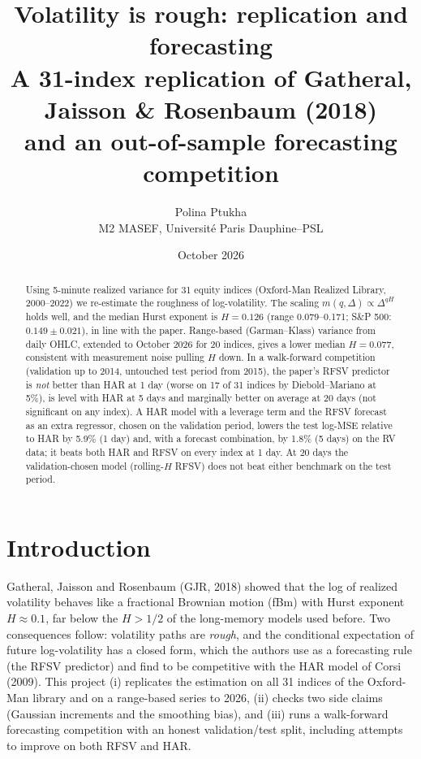 \documentclass[11pt,a4paper]{article}
\title{Volatility is rough: replication and forecasting\\[2pt]
\large A 31-index replication of Gatheral, Jaisson \& Rosenbaum (2018)\\ and an out-of-sample forecasting competition}
\author{Polina Ptukha\\ M2 MASEF, Universit\'e Paris Dauphine--PSL}
\date{October 2026}
\begin{document}
\maketitle

\begin{abstract}
\noindent
Using 5-minute realized variance for 31 equity indices (Oxford-Man Realized Library, 2000--2022) we
re-estimate the roughness of log-volatility. The scaling $m(q,\Delta)\propto\Delta^{qH}$ holds well,
and the median Hurst exponent is $H=0.126$ (range 0.079--0.171; S\&P 500: $0.149\pm0.021$), in line with the
paper. Range-based (Garman--Klass) variance from daily OHLC, extended to October 2026 for 20 indices,
gives a lower median $H=0.077$, consistent with measurement noise pulling $H$ down. In a walk-forward
competition (validation up to 2014, untouched test period from 2015), the paper's RFSV predictor is
\emph{not} better than HAR at 1 day (worse on 17 of 31 indices by Diebold--Mariano at 5\%), is level with HAR at
5 days and marginally better on average at 20 days (not significant on any index). A HAR model with a
leverage term and the RFSV forecast as an extra regressor, chosen on the validation period, lowers the
test log-MSE relative to HAR by 5.9\% (1 day) and, with a forecast combination, by 1.8\% (5 days) on the RV data; it
beats both HAR and RFSV on every index at 1 day. At 20 days the validation-chosen model (rolling-$H$ RFSV)
does not beat either benchmark on the test period.
\end{abstract}

\section{Introduction}
Gatheral, Jaisson and Rosenbaum (GJR, 2018) showed that the log of realized volatility behaves like
a fractional Brownian motion (fBm) with Hurst exponent $H\approx 0.1$, far below the $H>1/2$ of the
long-memory models used before. Two consequences follow: volatility paths are \emph{rough}, and the
conditional expectation of future log-volatility has a closed form, which the authors use as a
forecasting rule (the RFSV predictor) and find to be competitive with the HAR model of Corsi (2009).
This project (i) replicates the estimation on all 31 indices of the Oxford-Man library and on a
range-based series to 2026, (ii) checks two side claims (Gaussian increments and the smoothing bias),
and (iii) runs a walk-forward forecasting competition with an honest validation/test split, including
attempts to improve on both RFSV and HAR.
\end{document}
